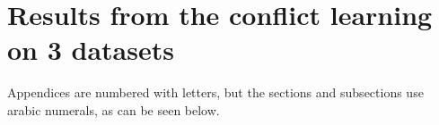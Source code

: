 \chapter{Results from the conflict learning on 3 datasets}
\label{app:D}
Appendices are numbered with letters, but the sections and subsections use
arabic numerals, as can be seen below.

%
%


